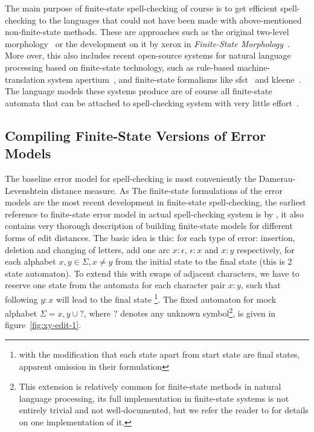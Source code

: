 \documentclass[a4paper,12pt]{article}
\begin{document}
The main purpose of finite-state spell-checking of course is to get efficient
spell-checking to the languages that could not have been made with
above-mentioned non-finite-state methods. These are approaches such as the
original two-level morphology~\cite[]{koskenniemi/1983} or the development on
it by xerox in \emph{Finite-State Morphology}~\cite[]{beesley2003finite}.  More
over, this also includes recent open-source systems for natural language
processing based on finite-state technology, such as rule-based
machine-translation system apertium~\cite[]{apertium2010}, and finite-state
formalisms like sfst~\cite[]{schmid2006programming} and
kleene~\cite[]{beesley2012kleene}.  The language models these systems produce
are of course all finite-state automata that can be attached to spell-checking
system with very little effort~\cite[e.g.][]{pirinen2012compiling}.

\subsection{Compiling Finite-State Versions of Error Models}
\label{subsec:error-models}

The baseline error model for spell-checking is most conveniently the
Damerau-Levenshtein distance measure. As The finite-state formulations of the
error models are the most recent development in finite-state spell-checking,
the earliest reference to finite-state error model in actual spell-checking
system is by \cite{schulz/2002}, it also contains very thorough description of
building finite-state models for different forms of edit distances. The basic
idea is this: for each type of error: insertion, deletion and changing of
letters, add one arc $x:\epsilon$, $\epsilon:x$ and $x:y$ respectively, for
each alphabet $x, y \in \Sigma, x \neq y$ from the initial state to the final
state (this is 2 state automaton). To extend this with swaps of adjacent
characters, we have to reserve one state from the automata for each character
pair $x:y$, such that following $y:x$ will lead to the final state
\cite[]{pirinen/2010/lrec}\footnote{with the modification that each state apart
from start state are final states, apparent omission in their formulation}.
The fixed automaton for mock alphabet $\Sigma = {x, y} \cup {?}$, where $?$
denotes any unknown symbol\footnote{This extension is relatively common for
    finite-state methods in natural language processing, its full
    implementation in finite-state systems is not entirely trivial and not
    well-documented, but we refer the reader to \cite[]{beesley2003finite} for
    details on one implementation of it.}, is given in
    figure~\ref{fig:xy-edit-1}.
\end{document}
